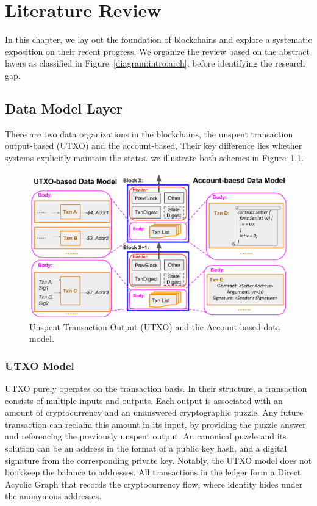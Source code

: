 
\chapter{Literature Review}
\label{ch:literature}
In this chapter, we lay out the foundation of blockchains and explore a systematic exposition on their recent progress.
We organize the review based on the abstract layers as classified in Figure~\ref{diagram:intro:arch}, before identifying the research gap. 

\section{Data Model Layer}
There are two data organizations in the blockchains, the unspent transaction output-based (UTXO) and the account-based. Their key difference lies whether systems explicitly maintain the states. we illustrate both schemes in Figure~\ref{diagram:literature:data_model}.

\begin{figure}
    \centering
    \includegraphics[width=0.8\linewidth]{diagram/literature/data_model.pdf}
    \vspace{\BeforeCaptionVSpace}
    \caption{Unspent Transaction Output (UTXO) and the Account-based data model. }
    \label{diagram:literature:data_model}
\end{figure}

\subsection{UTXO Model}
UTXO purely operates on the transaction basis. In their structure, a transaction consists of multiple inputs and outputs. Each output is associated with an amount of cryptocurrency and an unanswered cryptographic puzzle. Any future transaction can reclaim this amount in its input, by providing the puzzle answer and referencing the previously unspent output. An canonical puzzle and its solution can be an address in the format of a public key hash, and a digital signature from the corresponding private key. Notably, the UTXO model does not bookkeep the balance to addresses. All transactions in the ledger form a Direct Acyclic Graph that records the cryptocurrency flow, where identity hides under the anonymous addresses. 

